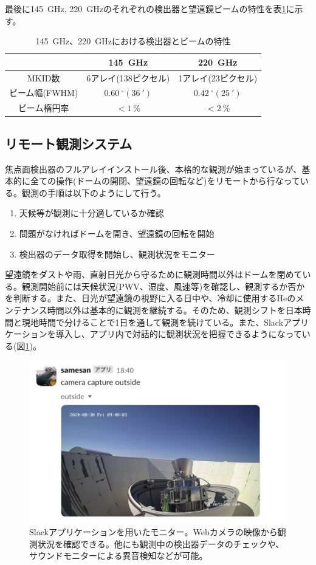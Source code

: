 最後に\SI{145}{GHz}, \SI{220}{GHz}のそれぞれの検出器と望遠鏡ビームの特性を表\ref{mkid_table}に示す。

\begin{table}[htbp]
  \centering
  \caption{\SI{145}{GHz}、\SI{220}{GHz}における検出器とビームの特性\cite{choi_doctor}}
  \vspace{3mm}
  \begin{tabular}{ccc} \hline
    & \SI{145}{GHz} & \SI{220}{GHz} \\ \hline
    MKID数 & 6アレイ(138ピクセル) & 1アレイ(23ピクセル)\\
    ビーム幅(FWHM) & $\SI{0.60}{^{\circ}}(\SI{36}{'})$ & $\SI{0.42}{^{\circ}}(\SI{25}{'})$\\
    ビーム楕円率 & $ < \SI{1}{\%} $ & $ < \SI{2}{\%} $\\ \hline
  \end{tabular}
  \label{mkid_table}
\end{table}

\subsection{リモート観測システム}
焦点面検出器のフルアレイインストール後、本格的な観測が始まっているが、基本的に全ての操作(ドームの開閉、望遠鏡の回転など)をリモートから行なっている。観測の手順は以下のようにして行う。
\begin{enumerate}
  \item 天候等が観測に十分適しているか確認
  \item 問題がなければドームを開き、望遠鏡の回転を開始
  \item 検出器のデータ取得を開始し、観測状況をモニター
\end{enumerate}
望遠鏡をダストや雨、直射日光から守るために観測時間以外はドームを閉めている。観測開始前には天候状況(PWV、湿度、風速等)を確認し、観測するか否かを判断する。また、日光が望遠鏡の視野に入る日中や、冷却に使用するHeのメンテナンス時間以外は基本的に観測を継続する。そのため、観測シフトを日本時間と現地時間で分けることで1日を通して観測を続けている。また、Slackアプリケーションを導入し、アプリ内で対話的に観測状況を把握できるようになっている(図\ref{samesan})。

\begin{figure}[htbp]
  \centering
  \includegraphics[width=0.6\columnwidth]{3_GB/figs/webcam.png}
  \caption{Slackアプリケーションを用いたモニター。Webカメラの映像から観測状況を確認できる。他にも観測中の検出器データのチェックや、サウンドモニターによる異音検知などが可能。}
  \label{samesan}
\end{figure}

